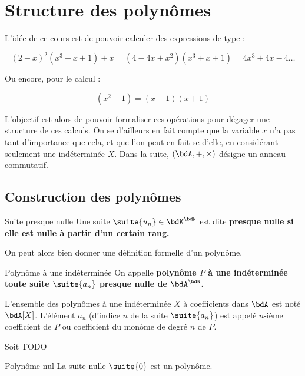 \documentclass[a4paper,french,bookmarks]{article}
\begin{document}

\initcours

\section{Structure des polynômes}

L'idée de ce cours est de pouvoir calculer des expressions de type :

\[ (2 - x)^2(x^3 + x + 1) + x = (4 - 4x + x^2)(x^3 + x + 1) = 4x^3 + 4x - 4 \dots \]

Ou encore, pour le calcul :

\[ (x^2 - 1) = (x-1)(x+1)\]

L'objectif est alors de pouvoir formaliser ces opérations pour dégager une structure de ces calculs. On se d'ailleurs en fait compte que la variable $x$ n'a pas tant d'importance que cela, et que l'on peut en fait se  d'elle, en considérant seulement une indéterminée $X$. Dans la suite, $(\bdA, +, \times)$ désigne un anneau commutatif.

\subsection{Construction des polynômes}

\begin{definition}{Suite presque nulle}
    Une suite $\suite{u_n} \in \bdK^\bdN$ est dite \bf{presque nulle} si elle est nulle à partir d'un certain rang.
\end{definition}

On peut alors bien donner une définition formelle d'un polynôme.

\begin{definition}{Polynôme à une indéterminée}{}
    On appelle \bf{polynôme $P$ à une indéterminée}  toute suite $\suite{a_n}$ presque nulle de $\bdA^\bdN$.
\end{definition}

L'ensemble des polynômes à une indéterminée $X$ à coefficients dans $\bdA$ est noté $\bdA[X]$. L'élément $a_n$ (d'indice $n$ de la suite $\suite{a_n}$) est appelé $n$-ième coefficient de $P$ ou coefficient du monôme de degré $n$ de $P$.

\begin{example}{}{}
    Soit TODO
\end{example}

\begin{property}{Polynôme nul}{}
    La suite nulle $\suite{0}$ est un polynôme.
\end{property}
\end{document}
